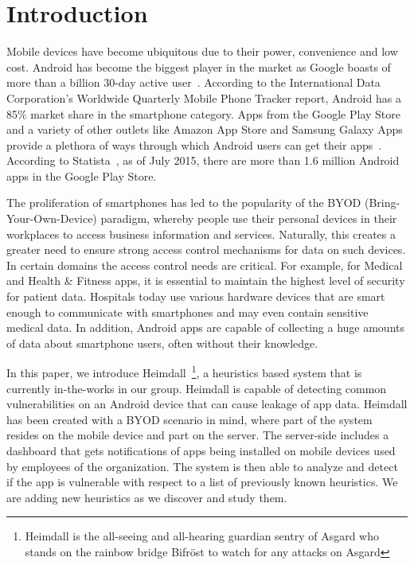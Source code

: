 \section{Introduction}
\label{intro}
\noindent
Mobile devices have become ubiquitous due to their power, convenience and low cost. Android has become the biggest player in the market as Google boasts of more than a billion 30-day active user~\cite{Engadget_market_share}. According to the International Data Corporation's Worldwide Quarterly Mobile Phone Tracker report, Android has a 85\% market share in the smartphone category. Apps from the Google Play Store and a variety of other outlets like Amazon App Store and Samsung Galaxy Apps provide a plethora of ways through which Android users can get their apps~\cite{Online_App_Stores}. According to Statista~\cite{Android_app_number}, as of July 2015, there are more than 1.6 million Android apps in the Google Play Store.

The proliferation of smartphones has led to the popularity of the BYOD (Bring-Your-Own-Device) paradigm, whereby people use their personal devices in their workplaces to access business information and services. Naturally, this creates a greater need to ensure strong access control mechanisms for data on such devices. In certain domains the access control needs are critical. For example, for Medical and Health \& Fitness apps, it is essential to maintain the highest level of security for patient data. Hospitals today use various hardware devices that are smart enough to communicate with smartphones and may even contain sensitive medical data. In addition, Android apps are capable of collecting a huge amounts of data about smartphone users, often without their knowledge.

In this paper, we introduce Heimdall~\footnote{Heimdall is the all-seeing and all-hearing guardian sentry of Asgard who stands on the rainbow bridge Bifr\"{o}st to watch for any attacks on Asgard}, a heuristics based system that is currently in-the-works in our group. Heimdall is capable of detecting common vulnerabilities on an Android device that can cause leakage of app data. Heimdall has been created with a BYOD scenario in mind, where part of the system resides on the mobile device and part on the server. The server-side includes a dashboard that gets notifications of apps being installed on mobile devices used by employees of the organization. The system is then able to analyze and detect if the app is vulnerable with respect to a list of previously known heuristics. We are adding new heuristics as we discover and study them. %

